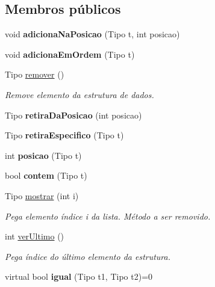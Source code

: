 \subsection*{Membros públicos}
\begin{DoxyCompactItemize}
\item 
\hypertarget{classLista_a21853f382bab3540ab6dfeece9fe3ba1}{void {\bfseries adiciona\-Na\-Posicao} (Tipo t, int posicao)}\label{classLista_a21853f382bab3540ab6dfeece9fe3ba1}

\item 
\hypertarget{classLista_a9c9a9ac8cbf7e849b2e470c3be5926a2}{void {\bfseries adiciona\-Em\-Ordem} (Tipo t)}\label{classLista_a9c9a9ac8cbf7e849b2e470c3be5926a2}

\item 
Tipo \hyperlink{classLista_a58768c31b7137a2303212b63e9804dc6}{remover} ()
\begin{DoxyCompactList}\small\item\em Remove elemento da estrutura de dados. \end{DoxyCompactList}\item 
\hypertarget{classLista_a554cfbab02c678a9186ffb3d80079e97}{Tipo {\bfseries retira\-Da\-Posicao} (int posicao)}\label{classLista_a554cfbab02c678a9186ffb3d80079e97}

\item 
\hypertarget{classLista_aff23d54db73f06e457eba73b886fd84f}{Tipo {\bfseries retira\-Especifico} (Tipo t)}\label{classLista_aff23d54db73f06e457eba73b886fd84f}

\item 
\hypertarget{classLista_ad374d77a408c513004c79cd33ddc76a3}{int {\bfseries posicao} (Tipo t)}\label{classLista_ad374d77a408c513004c79cd33ddc76a3}

\item 
\hypertarget{classLista_a3dcad88a266c9d487e149c366f7e8d05}{bool {\bfseries contem} (Tipo t)}\label{classLista_a3dcad88a266c9d487e149c366f7e8d05}

\item 
Tipo \hyperlink{classLista_a3f5160b0b143e8ccff2b0e01fa21dc76}{mostrar} (int i)
\begin{DoxyCompactList}\small\item\em Pega elemento índice i da lista. Método a ser removido. \end{DoxyCompactList}\item 
int \hyperlink{classLista_a14d6e9acad66f7b7c8630dbe2372057a}{ver\-Ultimo} ()
\begin{DoxyCompactList}\small\item\em Pega índice do último elemento da estrutura. \end{DoxyCompactList}\item 
\hypertarget{classLista_a7be3c390b9a5d9cd8230b25b10852566}{virtual bool {\bfseries igual} (Tipo t1, Tipo t2)=0}\label{classLista_a7be3c390b9a5d9cd8230b25b10852566}


\end{DoxyCompactItemize}

